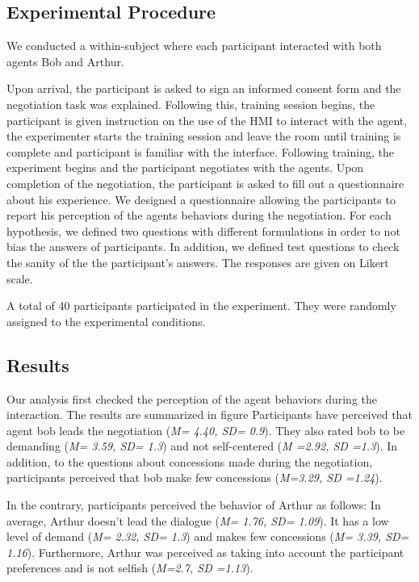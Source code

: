 \documentclass[runningheads,a4paper]{llncs}
\begin{document}
		\subsection{Experimental Procedure}
		We conducted a within-subject where each participant interacted with both  agents Bob and Arthur.
		
		Upon arrival, the participant is asked to sign an informed consent form and the negotiation task was explained. Following this, training session begins, the participant is given instruction on the use of the HMI to interact with the agent, the experimenter starts the training session and leave the room until training is complete and participant is familiar with the interface. Following training, the experiment begins and the participant negotiates with the agents. Upon completion of the negotiation, the participant is asked to fill out a questionnaire about his experience.
		We designed a questionnaire allowing the participants to report his perception of the agents behaviors during the negotiation. For each hypothesis, we defined two questions with different formulations in order to not bias the answers of participants. In addition, we defined test questions to check the sanity of the the participant's answers. The responses are given on Likert scale.

	
		A total of 40 participants participated in the experiment. They were randomly assigned to the experimental conditions.%
		
		\subsection{Results}
		
		
		Our analysis first checked the perception of the agent behaviors during the interaction. The results are summarized in figure 
		Participants have perceived that agent bob leads the negotiation (\emph{M= 4.40, SD= 0.9}). They also rated bob to be demanding (\emph{M= 3.59, SD= 1.3}) and not self-centered (\emph{M =2.92, SD =1.3}). In addition, to the questions about concessions made during the negotiation, participants perceived that bob make few concessions (\emph{M=3.29, SD =1.24}).
		
		In the contrary, participants perceived the behavior of Arthur as follows: In average, Arthur doesn't lead the dialogue (\emph{M= 1.76, SD= 1.09}). It has a low level of demand (\emph{M= 2.32, SD= 1.3}) and makes few concessions (\emph{M= 3.39, SD= 1.16}). Furthermore, Arthur was perceived as taking into account the participant preferences and is not selfish (\emph{M=2.7, SD =1.13}).
		
\end{document}

